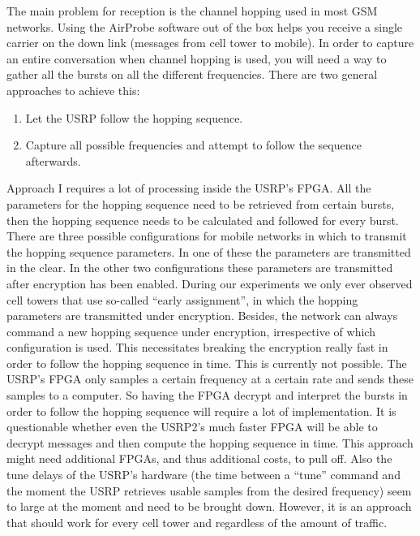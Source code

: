 \documentclass[a4paper,11pt]{llncs}
\begin{document}
The main problem for reception is the channel hopping used in most GSM networks. 
Using the AirProbe software out of the box helps you receive a single carrier on the down link (messages from cell tower to mobile). In order to capture an entire conversation when channel hopping is used, you will need a way to gather all the bursts on all the different frequencies. There are two general approaches to achieve this:
\renewcommand{\labelenumi}{\Roman{enumi}.}
\begin{enumerate}
\item \label{it:follow}Let the USRP follow the hopping sequence.
\item \label{it:all}Capture all possible frequencies and attempt to follow the sequence afterwards. 
\end{enumerate}
\renewcommand{\labelenumi}{\arabic{enumi}.}
Approach I requires a lot of processing inside the USRP's FPGA. All the parameters for the hopping sequence need to be retrieved from certain bursts, then the hopping sequence needs to be calculated and followed for every burst. There are three possible configurations for mobile networks in which to transmit the hopping sequence parameters. In one of these the parameters are transmitted in the clear. In the other two configurations these parameters are transmitted after encryption has been enabled. During our experiments we only ever observed cell towers that use so-called ``early assignment'', in which the hopping parameters are transmitted under encryption. Besides, the network can always command a new hopping sequence under encryption, irrespective of which configuration is used. This necessitates breaking the encryption really fast in order to follow the hopping sequence in time. This is currently not possible. The USRP's FPGA only samples a certain frequency at a certain rate and sends these samples to a computer. So having the FPGA decrypt and interpret the bursts in order to follow the hopping sequence will require a lot of implementation. It is questionable whether even the USRP2's much faster FPGA will be able to decrypt messages and then compute the hopping sequence in time. This approach might need additional FPGAs, and thus additional costs, to pull off. Also the tune delays of the USRP's hardware (the time between a ``tune'' command and the moment the USRP retrieves usable samples from the desired frequency) seem to large at the moment and need to be brought down. However, it is an approach that should work for every cell tower and regardless of the amount of traffic.\\
\end{document}
